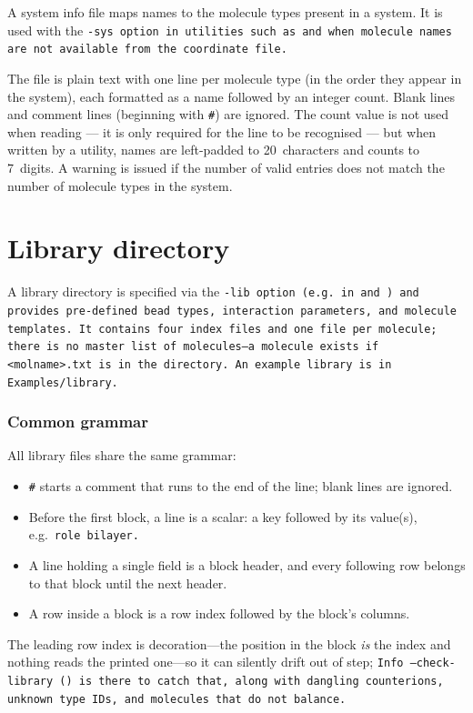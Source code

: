 A system info file maps names to the molecule types present in a system. It is
used with the \tt{-sys} option in utilities such as 
and  when molecule names are not available from the
coordinate file.

The file is plain text with one line per molecule type (in the order they
appear in the system), each formatted as a name followed by an integer count.
Blank lines and comment lines (beginning with \texttt{\#}) are ignored. The
count value is not used when reading --- it is only required for the line to be
recognised --- but when written by a utility, names are left-padded to
20~characters and counts to 7~digits. A warning is issued if the number of
valid entries does not match the number of molecule types in the system. %

\section{Library directory} \label{sec:LibDir} %

A library directory is specified via the \tt{-lib} option (e.g.\ in
 and ) and provides pre-defined bead
types, interaction parameters, and molecule templates. It contains four index
files and one file per molecule; there is no master list of molecules---a
molecule exists if \tt{<molname>.txt} is in the directory. An example library
is in \tt{Examples/library}.

\subsubsection*{Common grammar}

All library files share the same grammar:
\begin{itemize}[noitemsep]
  \item \texttt{\#} starts a comment that runs to the end of the line; blank
    lines are ignored.
  \item Before the first block, a line is a scalar: a key followed by its
    value(s), e.g.\ \tt{role bilayer}.
  \item A line holding a single field is a block header, and every following
    row belongs to that block until the next header.
  \item A row inside a block is a row index followed by the block's columns.
\end{itemize}
The leading row index is decoration---the position in the block \emph{is} the
index and nothing reads the printed one---so it can silently drift out of step;
\tt{Info --check-library} () is there to catch that, along
with dangling counterions, unknown type IDs, and molecules that do not balance.

